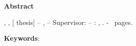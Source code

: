 \thispagestyle{empty} %

\noindent\LARGE \textbf{Abstract}\\

\normalsize

\vspace{0.5cm}
{
	\setlength{\parindent}{0pt}
	
	\autormeno{},  
	\nazovpraceanglicky{},
	\ifdefempty{\podnazovpraceanglicky}{}{%
		\podnazovpraceanglicky{},
	}
	[\typpraceanglicky{} thesis] –  
	\nazovuniverzityanglicky{},  
	\nazovfakultyanglicky{} –   
	Supervisor: \veducimeno{} –  
	\nazovmesta{}: \skratkafakulty{} \skratkauniverzity{},
	\aktualnyrok{}. -
	\pageref{LastPage}~pages.
}

\vspace{0.5cm}

\abstraktanglictina{}

\vspace{0.5cm}

{
	\setlength{\parindent}{0pt}

	\textbf{Keywords}: \klucoveslovaanglictina{}
}
\vspace{0.5cm}

\newpage
